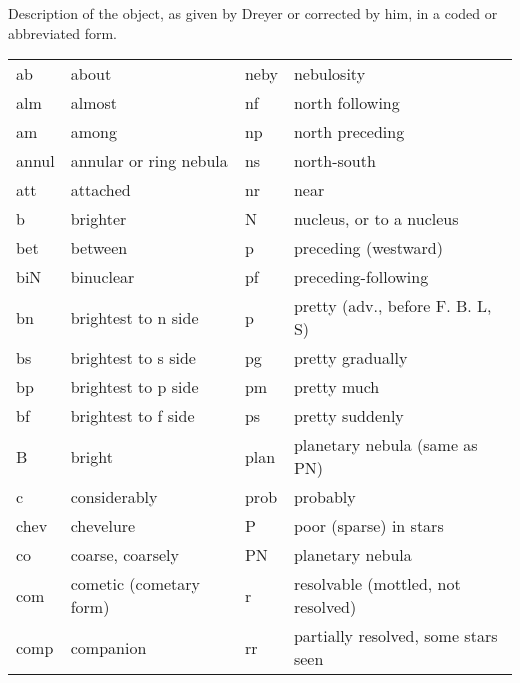 Description of the object, as given by Dreyer or
corrected by him, in a coded or abbreviated form.
\ \\[2ex]

\begin{tabular}{ll|ll}
ab     & about                      & neby     & nebulosity                                    \\
alm    & almost                     & nf       & north following                               \\
am     & among                      & np       & north preceding                               \\
annul  & annular or ring nebula     & ns       & north-south                                   \\
att    & attached                   & nr       & near                                          \\
b      & brighter                   & N        & nucleus, or to a nucleus                      \\
bet    & between                    & p        & preceding (westward)                          \\
biN    & binuclear                  & pf       & preceding-following                           \\
bn     & brightest to n side        & p        & pretty (adv., before F. B. L, S)              \\
bs     & brightest to s side        & pg       & pretty gradually                              \\
bp     & brightest to p side        & pm       & pretty much                                   \\
bf     & brightest to f side        & ps       & pretty suddenly                               \\
B      & bright                     & plan     & planetary nebula (same as PN)                 \\
c      & considerably               & prob     & probably                                      \\
chev   & chevelure                  & P        & poor (sparse) in stars                        \\
co     & coarse, coarsely           & PN       & planetary nebula                              \\
com    & cometic (cometary form)    & r        & resolvable (mottled, not resolved)            \\
comp   & companion                  & rr       & partially resolved, some stars seen           \\

\end{tabular}
